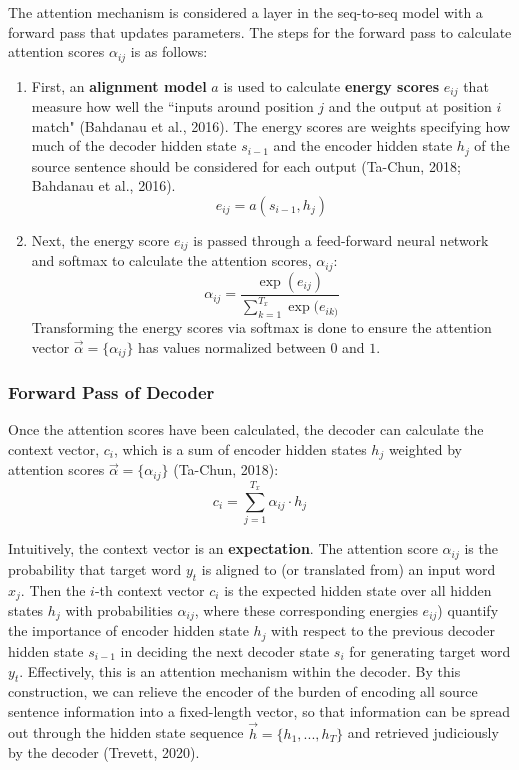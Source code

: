 The attention mechanism is considered a layer in the seq-to-seq model with a forward pass that updates parameters. The steps for the forward pass to calculate attention scores $\alpha_{ij}$ is as follows: 
\begin{enumerate}
    \item First, an \textbf{alignment model} $a$ is used to calculate \textbf{energy scores} $e_{ij}$ that measure how well the ``inputs around position $j$ and the output at position $i$ match" (Bahdanau et al., 2016). The energy scores are weights specifying how much of the decoder hidden state $s_{i-1}$ and the encoder hidden state $h_j$ of the source sentence should be considered for each output (Ta-Chun, 2018; Bahdanau et al., 2016). 
    $$
    e_{ij} = a(s_{i-1}, h_j)
    $$ 
    
    \item Next, the energy score $e_{ij}$ is passed through a feed-forward neural network and softmax to calculate the attention scores, $\alpha_{ij}$:
    $$
    \alpha_{ij} = \frac{\exp{(e_{ij})} } { \sum_{k=1}^{T_x} \exp{(e_{ik)}} }
    $$
    Transforming the energy scores via softmax is done to ensure the attention vector $\overrightarrow{\alpha} = \Big \{ \alpha_{ij} \Big \}$ has values normalized between $0$ and $1$. 
\end{enumerate}

\begin{center}
\end{center}


\subsubsection{Forward Pass of Decoder}

Once the attention scores have been calculated, the decoder can calculate the context vector, $c_i$, which is a sum of encoder hidden states $h_j$ weighted by attention scores $\overrightarrow{\alpha} = \Big \{ \alpha_{ij} \Big \}$ (Ta-Chun, 2018): 
$$
c_i = \sum_{j=1}^{T_x} \alpha_{ij} \cdot h_j
$$

Intuitively, the context vector is an \textbf{expectation}. The attention score $\alpha_{ij}$ is the probability that target word $y_t$ is aligned to (or translated from) an input word $x_j$. Then the $i$-th context vector $c_i$ is the expected hidden state over all hidden states $h_j$ with probabilities $\alpha_{ij}$, where these corresponding energies $e_{ij}$) quantify the importance of encoder hidden state $h_j$ with respect to the previous decoder hidden state $s_{i-1}$ in deciding the next decoder state $s_i$ for generating target word $y_t$. 
\newline Effectively, this is an attention mechanism within the decoder. By this construction, we can relieve the encoder of the burden of encoding all source sentence information into a fixed-length vector, so that information can be spread out through the hidden state sequence $\overrightarrow{h} = \Big \{ h_1,...,h_T\Big \}$ and retrieved judiciously by the decoder (Trevett, 2020). 

